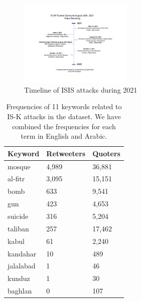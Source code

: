 \documentclass[letterpaper]{article} %
\begin{document}
\begin{figure}[ht]
\includegraphics[width=0.48\textwidth]{img/Timeline2021.pdf}
\caption{Timeline of ISIS attacks during 2021}
\label{fig:Timeline2021}
\end{figure}


\begin{table}[!htbp]
\centering
\begin{tabular}{|l||l|l|}
 \hline
 Keyword & Retweeters & Quoters\\ [0.5ex]
 \hline\hline
 mosque & 4,989 & 36,881\\\hline
 al-fitr & 3,095 & 15,151\\\hline
  bomb & 633 & 9,541\\\hline
  gun & 423 & 4,653\\\hline
  suicide & 316 & 5,204\\\hline
  taliban & 257 & 17,462\\\hline
  kabul & 61 & 2,240\\\hline
  kandahar & 10 & 489\\\hline
  jalalabad & 1 & 46\\\hline
  kunduz & 1 & 30\\\hline
  baghlan & 0 & 107\\[0.25ex]\hline
\end{tabular}
\caption{Frequencies of 11 keywords related to IS-K attacks in the dataset. We have combined the frequencies for each term in English and Arabic.}
\label{table:attacks}
\end{table}
\end{document}
